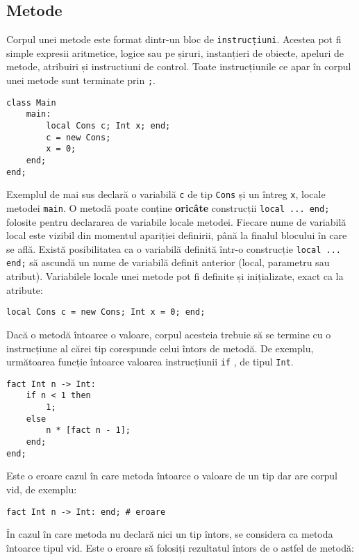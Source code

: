 \documentclass[12pt]{article}
\begin{document}
\subsection{Metode}

Corpul unei metode este format dintr-un bloc de \texttt{instrucțiuni}. Acestea pot fi simple expresii aritmetice, logice sau pe șiruri, instanțieri de obiecte, apeluri de metode, atribuiri și instructiuni de control. Toate instrucțiunile ce apar în corpul unei metode sunt terminate prin \texttt{;}.

\begin{verbatim}
class Main
    main:
        local Cons c; Int x; end;
        c = new Cons;
        x = 0;
    end;
end;
\end{verbatim}

Exemplul de mai sus declară o variabilă \texttt{c} de tip \texttt{Cons} și un întreg \texttt{x}, locale metodei \texttt{main}. O metodă poate conține \textbf{oricâte} construcții \texttt{local ... end;} folosite pentru declararea de variabile locale metodei. Fiecare nume de variabilă local este vizibil din momentul apariției definirii, până la finalul blocului în care se află. Există posibilitatea ca o variabilă definită într-o construcție \texttt{local ... end;} să ascundă un nume de variabilă definit anterior (local, parametru sau atribut). Variabilele locale unei metode pot fi definite și inițializate, exact ca la atribute:

\begin{verbatim}
local Cons c = new Cons; Int x = 0; end;
\end{verbatim}

Dacă o metodă întoarce o valoare, corpul acesteia trebuie să se termine cu o instrucțiune al cărei tip corespunde celui întors de metodă. De exemplu, următoarea funcție întoarce valoarea instrucțiunii \texttt{if} , de tipul \texttt{Int}.

\begin{verbatim}
fact Int n -> Int:
    if n < 1 then 
        1; 
    else 
        n * [fact n - 1];
    end;
end;
\end{verbatim}

Este o eroare cazul în care metoda întoarce o valoare de un tip dar are corpul vid, de exemplu:

\begin{verbatim}
fact Int n -> Int: end; # eroare
\end{verbatim}

În cazul în care metoda nu declară nici un tip întors, se considera ca metoda întoarce tipul vid. Este o eroare să folosiți rezultatul întors de o astfel de metodă:
\end{document}
